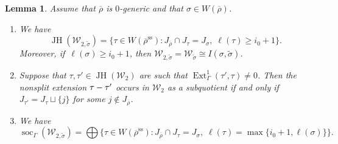 \documentclass[JEP,XML,SOM,Unicode,NoFloatCountersInSection, NoEqCountersInSection,published]{cedram}
\let\wt\widetilde
\newcommand{\cW}{\mathcal{W}}
\renewcommand{\ss}{\mathrm{ss}}
\newcommand{\brho}{\overline{\rho}}
\DeclareMathOperator{\Ext}{Ext}
\DeclareMathOperator{\JH}{\mathrm{JH}}
\DeclareMathOperator{\soc}{soc}
\theoremstyle{plain}
\newtheorem{lem}[prop]{Lemma}
\theoremstyle{definition}
\begin{document}
\begin{lem}\label{lem:W2}
Assume that $\brho$ is {$0$}-generic
and that $\sigma \in W(\brho)$.
\begin{enumerate}
\item
\label{it:lem:W2:1}
We have
\begin{equation*}\JH(\mathcal{W}_{2,\wt{\sigma}})=\{\tau\in W(\brho^\ss): J_{\brho}\cap J_{\tau} =J_{\sigma},\; \ell(\tau)\ge i_0+1\}.\end{equation*}
Moreover, if~$\ell(\sigma)\geq i_0+1$, then $\mathcal{W}_{2,\wt{\sigma}}=\mathcal{W}_{\wt\sigma}\cong I(\sigma,\wt{\sigma})$.
\item
\label{it:lem:W2:2}
Suppose that $\tau,\tau' \in \JH(\cW_2)$ are such that $\Ext^1_{\Gamma}(\tau',\tau)\neq0$.
Then the nonsplit extension $\tau\-- \tau'$ occurs in $\mathcal{W}_{2}$ as a subquotient if and only if $J_{\tau'}=J_{\tau}\sqcup\{j\}$ for some $j\notin J_{\brho}$.
\item
\label{it:lem:W2:3}
We have
\begin{equation*}\soc_\Gamma(\mathcal{W}_{2,\wt{\sigma}})=\bigoplus \big\{\tau\in W(\brho^\ss): J_{\brho}\cap J_{\tau} =J_{\sigma},\; \ell(\tau)=\max\{i_0+1,\ell(\sigma)\}\big\}.\end{equation*}
\end{enumerate}
\end{lem}
\end{document}
